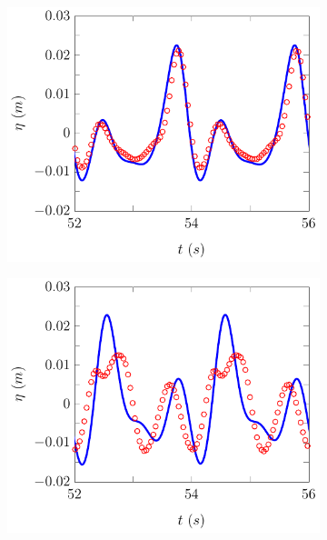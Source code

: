 \begin{figure}
	\centering
	\begin{subfigure}{0.5\textwidth}
		\includegraphics[width=\textwidth]{./chp6/figures/Experiment/Beji/sl/FDVMWG5.pdf}
		\vspace{0.5cm}
	\end{subfigure}%
	\begin{subfigure}{0.5\textwidth}
		\includegraphics[width=\textwidth]{./chp6/figures/Experiment/Beji/sl/FDVMWG6.pdf}
		\vspace{0.5cm}

\end{subfigure}
\end{figure}
